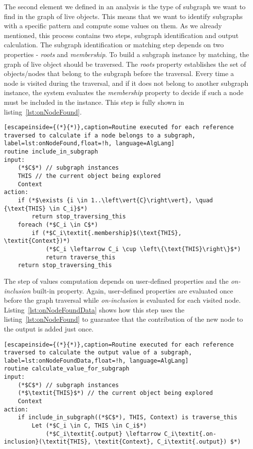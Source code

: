 The second element we defined in an analysis is the type of subgraph we want to find in the graph of live objects.
This means that we want to identify subgraphs with a specific pattern and compute some values on them.
As we already mentioned, this process contains two steps, subgraph identification and output calculation.
The subgraph identification or matching step depends on two properties - \textit{roots} and \textit{membership}.
To build a subgraph instance by matching, the graph of live object should be traversed.  
The \textit{roots} property establishes the set of objects/nodes that belong to the subgraph before the traversal.
Every time a node is visited during the traversal, and if it does not belong to another subgraph instance, the system evaluates the \textit{membership} property to decide if such a node must be included in the instance.
This step is fully shown in listing~\ref{lst:onNodeFound}.

\begin{lstlisting}[escapeinside={(*}{*)},caption=Routine executed for each reference traversed to calculate if a node belongs to a subgraph, label=lst:onNodeFound,float=!h, language=AlgLang]
routine include_in_subgraph
input:
	(*$C$*) // subgraph instances
	THIS // the current object being explored
	Context
action:
	if (*$\exists {i \in 1..\left\vert{C}\right\vert}, \quad {\text{THIS} \in C_i}$*)
		return stop_traversing_this
	foreach (*$C_i \in C$*)
		if (*$C_i\textit{.membership}$(\text{THIS}, \textit{Context})*)
			(*$C_i \leftarrow C_i \cup \left\{\text{THIS}\right\}$*)
			return traverse_this
	return stop_traversing_this
\end{lstlisting}

The step of values computation depends on user-defined properties and the \textit{on-inclusion} built-in property.
Again, user-defined properties are evaluated once before the graph traversal while \textit{on-inclusion} is evaluated for each visited node.
Listing~\ref{lst:onNodeFoundData} shows how this step uses the listing~\ref{lst:onNodeFound} to guarantee that the contribution of the new node to the output is added just once.

\begin{lstlisting}[escapeinside={(*}{*)},caption=Routine executed for each reference traversed to calculate the output value of a subgraph, label=lst:onNodeFoundData,float=!h, language=AlgLang]
routine calculate_value_for_subgraph
input:
	(*$C$*) // subgraph instances
	(*$\textit{THIS}$*) // the current object being explored
	Context
action:
	if include_in_subgraph((*$C$*), THIS, Context) is traverse_this
		Let (*$C_i \in C, THIS \in C_i$*) 
			(*$C_i\textit{.output} \leftarrow C_i\textit{.on-inclusion}(\textit{THIS}, \textit{Context}, C_i\textit{.output}) $*)
\end{lstlisting}


